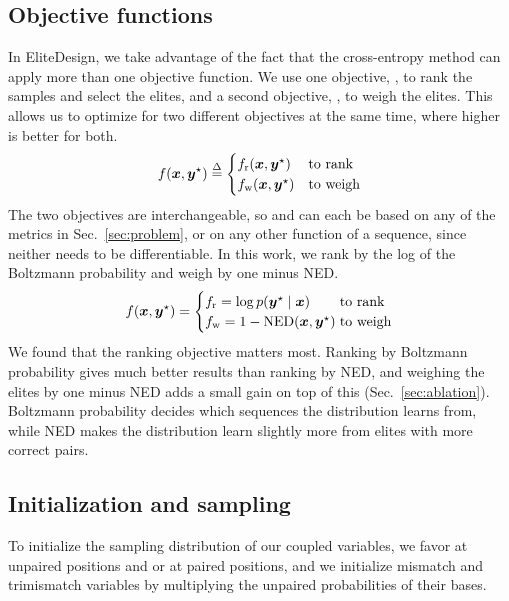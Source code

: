 \subsection{Objective functions}\label{sec:objectives}
In EliteDesign, we take advantage of the fact that the cross-entropy method can apply more than one objective function. We use one objective, \frank, to rank the samples and select the elites, and a second objective, \fweight, to weigh the elites. This allows us to optimize for two different objectives at the same time, where higher is better for both.
\begin{equation}
f(\boldsymbol{{x}},\boldsymbol{{y}}^\star)\stackrel{\Delta}{=}
\begin{cases}
f_{\mathrm{r}}(\boldsymbol{{x}},\boldsymbol{{y}}^\star) & \text{to rank}\\
f_{\mathrm{w}}(\boldsymbol{{x}},\boldsymbol{{y}}^\star) & \text{to weigh}
\end{cases}
\label{eq:pair}
\end{equation}
The two objectives are interchangeable, so \frank and \fweight can each be based on any of the metrics in Sec.~\ref{sec:problem}, or on any other function of a sequence, since neither needs to be differentiable. In this work, we rank by the log of the Boltzmann probability and weigh by one minus NED.
\begin{equation}
f(\boldsymbol{{x}},\boldsymbol{{y}}^\star)=
\begin{cases}
f_{\mathrm{r}}=\log p(\boldsymbol{{y}}^\star\mid\boldsymbol{{x}}) &\hspace{-0.7em} \text{to rank}\\
f_{\mathrm{w}}=1-\text{NED}(\boldsymbol{{x}},\boldsymbol{{y}}^\star) &\hspace{-0.7em} \text{to weigh}
\end{cases}
\label{eq:ourpair}
\end{equation}
We found that the ranking objective matters most. Ranking by Boltzmann probability gives much better results than ranking by NED, and weighing the elites by one minus NED adds a small gain on top of this (Sec.~\ref{sec:ablation}). Boltzmann probability decides which sequences the distribution learns from, while NED makes the distribution learn slightly more from elites with more correct pairs.

\subsection{Initialization and sampling}\label{sec:sampling}
To initialize the sampling distribution of our coupled variables, we favor \nucA{} at unpaired positions and \nucC\nucG{} or \nucG\nucC{} at paired positions, and we initialize mismatch and trimismatch variables by multiplying the unpaired probabilities of their bases.

